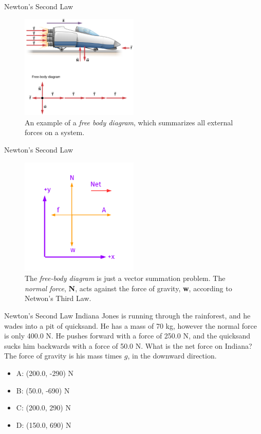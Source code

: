 \documentclass{beamer}
\begin{document}
\begin{frame}{Newton's Second Law}
\begin{figure}
\centering
\includegraphics[width=0.5\textwidth]{figures/NewtonsSecond3.png}
\caption{\label{fig:newton3} An example of a \textit{free body diagram}, which summarizes all external forces on a system.}
\end{figure}
\end{frame}

\begin{frame}{Newton's Second Law}
\begin{figure}
\centering
\includegraphics[width=0.5\textwidth,trim=0.75cm 0.5cm 0.75cm 0.5cm,clip=true]{figures/NetForce.pdf}
\caption{\label{fig:fbd} The \textit{free-body diagram} is just a vector summation problem.  The \textit{normal force}, \textbf{N}, acts against the force of gravity, \textbf{w}, according to Netwon's Third Law.}
\end{figure}
\end{frame}

\begin{frame}{Newton's Second Law}
Indiana Jones is running through the rainforest, and he wades into a pit of quicksand.  He has a mass of 70 kg, however the normal force is only 400.0 N.  He pushes forward with a force of 250.0 N, and the quicksand sucks him backwards with a force of 50.0 N.  What is the net force on Indiana?  The force of gravity is his mass times $g$, in the downward direction.
\begin{itemize}
\item A: (200.0, -290) N
\item B: (50.0, -690) N
\item C: (200.0, 290) N
\item D: (150.0, 690) N
\end{itemize}
\end{frame}
\end{document}
